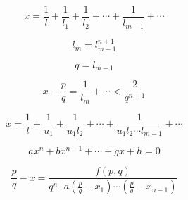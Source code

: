 \documentclass{article}
\begin{document}
\begin{equation}
  x = \frac{1}{l} + \frac{1}{l_1} + \frac{1}{l_2} + \cdots + \frac{1}{l_{m-1}}
  + \cdots
\end{equation}

\begin{equation}
  l_m = l_{m-1}^{n+1}
\end{equation}

\begin{equation}
  q = l_{m-1}
\end{equation}

\begin{equation}
  x - \frac{p}{q}=\frac{1}{l_m}+\cdots < \frac{2}{q^{n+1}}
\end{equation}

\begin{equation}
  x = \frac{1}{l} + \frac{1}{u_1} + \frac{1}{u_1 l_2} + \cdots
  + \frac{1}{u_1 l_2 \cdots l_{m-1}} + \cdots
\end{equation}

\begin{equation}
  ax^n + bx^{n-1} + \cdots + gx + h = 0
\end{equation}

\begin{equation}
  \frac{p}{q} - x = \frac{f(p,q)}{q^n\cdot a\left(\frac{p}{q} - x_1\right)\cdots\left(\frac{p}{q}-x_{n-1}\right)}
\end{equation}
\end{document}
